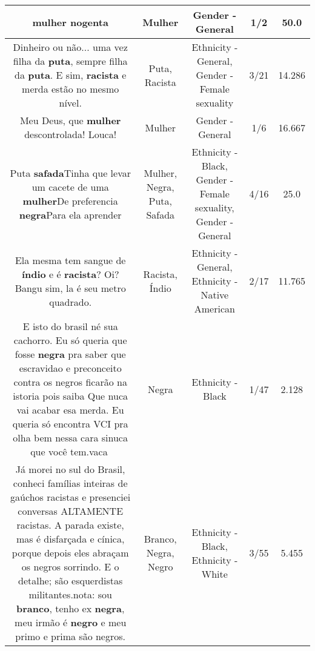 \documentclass[11pt]{article}
\newlength\mylength
\begin{document}
\begin{center}
\begin{longtable}{|C{.65\mylength}|C{.30\mylength}|C{.12\mylength}|C{.12\mylength}|C{.12\mylength}|}
  \small mulher nogenta\normalsize   & Mulher & Gender - General & 1/2 & 50.0 \\  \hline
  \small Dinheiro ou não... uma vez filha da \textbf{puta}, sempre filha da \textbf{puta}. E sim, \textbf{racista} e merda estão no mesmo nível.\normalsize   & Puta, Racista & Ethnicity - General, Gender - Female sexuality & 3/21 & 14.286 \\  \hline
  \small Meu Deus, que \textbf{mulher} descontrolada! Louca!\normalsize   & Mulher & Gender - General & 1/6 & 16.667 \\  \hline
  \small Puta \textbf{safada}Tinha que levar um cacete de uma \textbf{mulher}De preferencia \textbf{negra}Para ela aprender\normalsize   & Mulher, Negra, Puta, Safada & Ethnicity - Black, Gender - Female sexuality, Gender - General & 4/16 & 25.0 \\  \hline
  \small Ela mesma tem sangue de \textbf{índio} e é \textbf{racista}? Oi?Bangu sim, la é seu metro quadrado.\normalsize   & Racista, Índio & Ethnicity - General, Ethnicity - Native American & 2/17 & 11.765 \\  \hline
  \small E isto do brasil né sua cachorro. Eu   só queria que fosse \textbf{negra} pra saber que escravidao e preconceito contra os negros ficarão na istoria pois saiba Que nuca vai acabar esa merda. Eu queria só encontra VCI pra olha bem nessa cara sinuca que você tem.vaca💩\normalsize   & Negra & Ethnicity - Black & 1/47 & 2.128 \\  \hline
  \small Já morei no sul do Brasil, conheci famílias inteiras de gaúchos racistas e presenciei conversas ALTAMENTE racistas. A parada existe, mas é disfarçada e cínica, porque depois eles abraçam os negros sorrindo. E o detalhe; são esquerdistas militantes.nota: sou \textbf{branco}, tenho ex \textbf{negra}, meu irmão é \textbf{negro} e meu primo e prima são negros.\normalsize   & Branco, Negra, Negro & Ethnicity - Black, Ethnicity - White & 3/55 & 5.455 \\  \hline

\end{longtable}
\end{center}
\end{document}
